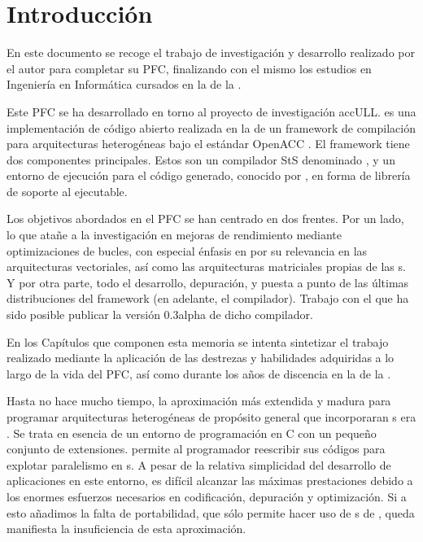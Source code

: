 %
%

\chapter*{Introducción}

En este documento se recoge el trabajo de investigación y desarrollo realizado por el 
autor para completar su \acf{PFC}, finalizando con el mismo
los estudios en Ingeniería en Informática cursados en la \ETSII{} de la \ULL{}.

Este \ac{PFC} se ha desarrollado en torno al proyecto de investigación \acf{accULL}.
\accULL{} es una implementación de código abierto realizada en la \ULL{} de un framework 
de compilación para arquitecturas heterogéneas bajo el estándar \ac{OpenACC} 
\cite{URL::OpenACC}. El framework 
tiene dos componentes principales. Estos son un compilador \ac{StS} 
denominado \yacf{} \cite{Reyes:2013:YAC}, y un entorno de ejecución para el 
código generado, conocido por 
\Frangollo{} \cite{Reyes:2013:FRT}, en forma de librería de soporte al ejecutable.

Los objetivos abordados en el \ac{PFC} se han centrado en dos frentes. Por un lado,
lo que atañe a la investigación
en mejoras de rendimiento mediante optimizaciones de bucles, con especial énfasis en
\tiling{} por su relevancia en las arquitecturas vectoriales, así como las arquitecturas
matriciales propias de las \gpu{}s.
Y por otra parte, todo el desarrollo,
depuración, y puesta a punto de las últimas distribuciones del framework \accULL{}
(en adelante, el compilador). Trabajo con el que ha sido posible publicar la versión
0.3alpha de dicho compilador.

En los Capítulos que componen esta memoria se intenta sintetizar el trabajo realizado 
mediante la aplicación de las destrezas y habilidades adquiridas a lo largo de la
vida del \ac{PFC}, así como durante los años de discencia en la \ETSII{} de la \ULL{}.

Hasta no hace mucho tiempo, la aproximación más extendida y madura para programar 
arquitecturas heterogéneas de propósito general que incorporaran \GPU{}s era
\CUDA{} \cite{Nickolls:2008:SPP}. Se trata en esencia de un entorno de programación en C 
con un pequeño conjunto de 
extensiones. \CUDA{} permite al programador reescribir sus códigos para explotar 
paralelismo en \GPU{}s. A pesar de la relativa simplicidad del desarrollo de aplicaciones
en este entorno, es difícil alcanzar las máximas prestaciones debido a los enormes
esfuerzos necesarios en codificación, depuración y optimización. 
Si a esto añadimos la falta de portabilidad, que sólo permite hacer uso de \GPU{}s de 
\NVIDIA{},
queda manifiesta la insuficiencia de esta aproximación. 

